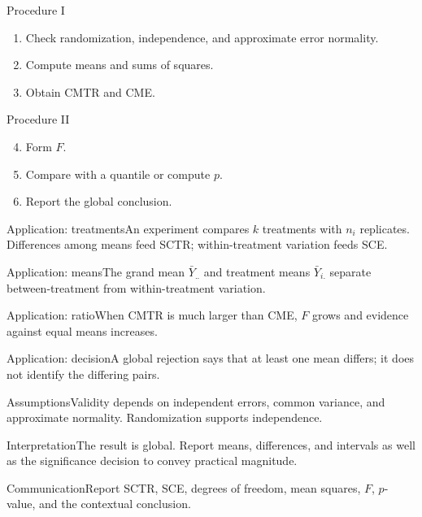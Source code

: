 \documentclass[10pt,aspectratio=169]{beamer}
\begin{document}
\begin{frame}{Procedure I}\small\begin{enumerate}\item Check randomization, independence, and approximate error normality.\item Compute means and sums of squares.\item Obtain CMTR and CME.\end{enumerate}\end{frame}
\begin{frame}{Procedure II}\small\begin{enumerate}\setcounter{enumi}{3}\item Form $F$.\item Compare with a quantile or compute $p$.\item Report the global conclusion.\end{enumerate}\end{frame}
\begin{frame}{Application: treatments}\small An experiment compares $k$ treatments with $n_i$ replicates. Differences among means feed SCTR; within-treatment variation feeds SCE.\end{frame}
\begin{frame}{Application: means}\small The grand mean $\bar Y_{..}$ and treatment means $\bar Y_{i.}$ separate between-treatment from within-treatment variation.\end{frame}
\begin{frame}{Application: ratio}\small When CMTR is much larger than CME, $F$ grows and evidence against equal means increases.\end{frame}
\begin{frame}{Application: decision}\small A global rejection says that at least one mean differs; it does not identify the differing pairs.\end{frame}
\begin{frame}{Assumptions}\small Validity depends on independent errors, common variance, and approximate normality. Randomization supports independence.\end{frame}
\begin{frame}{Interpretation}\small The result is global. Report means, differences, and intervals as well as the significance decision to convey practical magnitude.\end{frame}
\begin{frame}{Communication}\small Report SCTR, SCE, degrees of freedom, mean squares, $F$, $p$-value, and the contextual conclusion.\end{frame}
\end{document}
